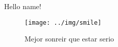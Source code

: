 \documentclass{article}
\begin{document}
  Hello {{name}}!
  \begin{figure}[h!]
    \centering
        \texttt{[image: ../img/smile]}
      \caption{Mejor sonreir que estar serio}
  \end{figure}
\end{document}
